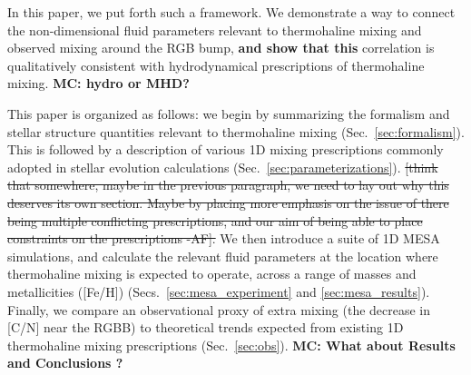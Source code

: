 In this paper, we put forth such a framework. 
We demonstrate a way to connect the non-dimensional fluid parameters relevant to thermohaline mixing and observed mixing around the RGB bump, \textbf{and show that this} correlation is qualitatively consistent with hydrodynamical prescriptions of thermohaline mixing. \textbf{MC: hydro or MHD?} 

This paper is organized as follows: we begin by summarizing the formalism and stellar structure quantities relevant to thermohaline mixing (Sec.~\ref{sec:formalism}). This is followed by a description of various 1D mixing prescriptions commonly adopted in stellar evolution calculations (Sec.~\ref{sec:parameterizations}). \sout{[think that somewhere, maybe in the previous paragraph, we need to lay out why this deserves its own section. Maybe by placing more emphasis on the issue of there being multiple conflicting prescriptions, and our aim of being able to place constraints on the prescriptions -AF].}
We then introduce a suite of 1D MESA simulations, and calculate the relevant fluid parameters at the location where thermohaline mixing is expected to operate, across a range of masses and metallicities ([Fe/H])  (Secs.~\ref{sec:mesa_experiment} and \ref{sec:mesa_results}). 
Finally, we compare an observational proxy of extra mixing (the decrease in [C/N] near the RGBB) to theoretical trends expected from existing 1D thermohaline mixing prescriptions (Sec.~\ref{sec:obs}). 
\textbf{MC: What about Results and Conclusions ?}

